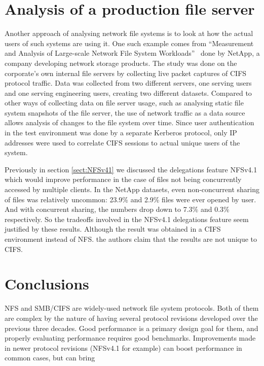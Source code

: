 \section{Analysis of a production file server}

Another approach of analysing network file systems is to look at how the actual users of such systems are using it.
One such example comes from ``Measurement and Analysis of Large-scale Network File System Workloads''~\cite{NetApp} done by NetApp,
a company developing network storage products.
The study was done on the corporate's own internal file servers by collecting live packet captures of CIFS protocol traffic.
Data was collected from two different servers, one serving users and one serving engineering users, creating two different datasets.
Compared to other ways of collecting data on file server usage, such as analysing static file system snapshots of the file server,
the use of network traffic as a data source allows analysis of changes to the file system over time.
Since user authentication in the test environment was done by a separate Kerberos protocol,
only IP addresses were used to correlate CIFS sessions to actual unique users of the system.

Previously in section \ref{sect:NFSv41} we discussed the delegations feature NFSv4.1 which would improve performance in the case of files not being concurrently accessed by multiple clients.
In the NetApp datasets, even non-concurrent sharing of files was relatively uncommon: 23.9\% and 2.9\% files were ever opened by user.
And with concurrent sharing, the numbers drop down to 7.3\% and 0.3\% respectively.
So the tradeoffs involved in the NFSv4.1 delegations feature seem justified by these results.
Although the result was obtained in a CIFS environment instead of NFS.
the authors claim that the results are not unique to CIFS.

\section{Conclusions}
NFS and SMB/CIFS are widely-used network file system protocols.
Both of them are complex by the nature of having several protocol revisions developed over the previous three decades.
Good performance is a primary design goal for them, and properly evaluating performance requires good benchmarks.
Improvements made in newer protocol revisions (NFSv4.1 for example) can boost performance in common cases,
but can bring
